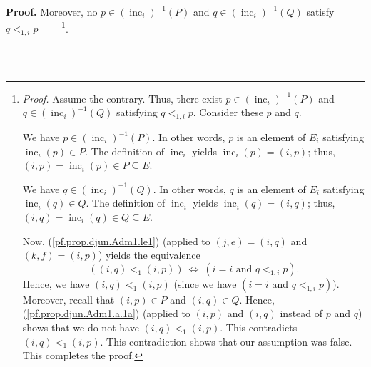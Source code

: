 \documentclass[numbers=enddot,12pt,final,onecolumn,notitlepage,abstracton]{scrartcl}
\theoremstyle{definition}
\newenvironment{proof}[1][Proof]{\noindent\textbf{#1.} }{\ \rule{0.5em}{0.5em}}
\newenvironment{verlong}{}{}
\begin{document}
\begin{verlong}
\begin{footnotesize}
\begin{proof}
Moreover, no $p\in\left(  \operatorname*{inc}\nolimits_{i}\right)
^{-1}\left(  P\right)  $ and $q\in\left(  \operatorname*{inc}\nolimits_{i}%
\right)  ^{-1}\left(  Q\right)  $ satisfy $q<_{1,i}p$%
\ \ \ \ \footnote{\textit{Proof.} Assume the contrary. Thus, there exist
$p\in\left(  \operatorname*{inc}\nolimits_{i}\right)  ^{-1}\left(  P\right)  $
and $q\in\left(  \operatorname*{inc}\nolimits_{i}\right)  ^{-1}\left(
Q\right)  $ satisfying $q<_{1,i}p$. Consider these $p$ and $q$.
\par
We have $p\in\left(  \operatorname*{inc}\nolimits_{i}\right)  ^{-1}\left(
P\right)  $. In other words, $p$ is an element of $E_{i}$ satisfying
$\operatorname*{inc}\nolimits_{i}\left(  p\right)  \in P$. The definition of
$\operatorname*{inc}\nolimits_{i}$ yields $\operatorname*{inc}\nolimits_{i}%
\left(  p\right)  =\left(  i,p\right)  $; thus, $\left(  i,p\right)
=\operatorname*{inc}\nolimits_{i}\left(  p\right)  \in P\subseteq E$.
\par
We have $q\in\left(  \operatorname*{inc}\nolimits_{i}\right)  ^{-1}\left(
Q\right)  $. In other words, $q$ is an element of $E_{i}$ satisfying
$\operatorname*{inc}\nolimits_{i}\left(  q\right)  \in Q$. The definition of
$\operatorname*{inc}\nolimits_{i}$ yields $\operatorname*{inc}\nolimits_{i}%
\left(  q\right)  =\left(  i,q\right)  $; thus, $\left(  i,q\right)
=\operatorname*{inc}\nolimits_{i}\left(  q\right)  \in Q\subseteq E$.
\par
Now, (\ref{pf.prop.djun.Adm1.le1}) (applied to $\left(  j,e\right)  =\left(
i,q\right)  $ and $\left(  k,f\right)  =\left(  i,p\right)  $) yields the
equivalence%
\[
\left(  \left(  i,q\right)  <_{1}\left(  i,p\right)  \right)
\ \Longleftrightarrow\ \left(  i=i\text{ and }q<_{1,i}p\right)  .
\]
Hence, we have $\left(  i,q\right)  <_{1}\left(  i,p\right)  $ (since we have
$\left(  i=i\text{ and }q<_{1,i}p\right)  $). Moreover, recall that $\left(
i,p\right)  \in P$ and $\left(  i,q\right)  \in Q$. Hence,
(\ref{pf.prop.djun.Adm1.a.1a}) (applied to $\left(  i,p\right)  $ and $\left(
i,q\right)  $ instead of $p$ and $q$) shows that we do not have $\left(
i,q\right)  <_{1}\left(  i,p\right)  $. This contradicts $\left(  i,q\right)
<_{1}\left(  i,p\right)  $. This contradiction shows that our assumption was
false. This completes the proof.}.


\end{proof}
\end{footnotesize}
\end{verlong}
\end{document}
